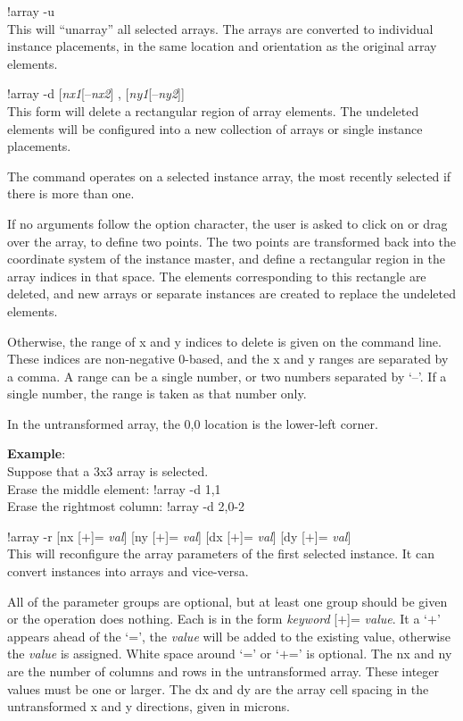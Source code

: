 \begin{description}
\item{\vt !array -u}\\
This will ``unarray'' all selected arrays.  The arrays are converted
to individual instance placements, in the same location and
orientation as the original array elements.

\item{{\vt !array -d} [{\it nx1\/}[--{\it nx2\/}] ,
 [{\it ny1\/}[--{\it ny2\/}]]}\\
This form will delete a rectangular region of array elements.  The
undeleted elements will be configured into a new collection of arrays
or single instance placements.

The command operates on a selected instance array, the most recently
selected if there is more than one.

If no arguments follow the option character, the user is asked to
click on or drag over the array, to define two points.  The two points
are transformed back into the coordinate system of the instance
master, and define a rectangular region in the array indices in that
space.  The elements corresponding to this rectangle are deleted, and
new arrays or separate instances are created to replace the undeleted
elements.

Otherwise, the range of x and y indices to delete is given on the
command line.  These indices are non-negative 0-based, and the x and y
ranges are separated by a comma.  A range can be a single number, or
two numbers separated by `--'.  If a single number, the range is taken
as that number only.

In the untransformed array, the 0,0 location is the lower-left
corner.

{\bf Example}:\\
Suppose that a 3x3 array is selected.\\
Erase the middle element: {\vt !array -d 1,1}\\
Erase the rightmost column: {\vt !array -d 2,0-2}

\item{{\vt !array -r} [{\vt nx} [$+$]= {\it val\/}]
      [{\vt ny} [$+$]= {\it val\/}]
      [{\vt dx} [$+$]= {\it val\/}] [{\vt dy} [$+$]= {\it val\/}]}\\
This will reconfigure the array parameters of the first selected
instance.  It can convert instances into arrays and vice-versa.

All of the parameter groups are optional, but at least one group
should be given or the operation does nothing.  Each is in the form
{\it keyword} [$+$]= {\it value\/}.  It a `$+$' appears ahead of the
`=', the {\it value} will be added to the existing value, otherwise
the {\it value} is assigned.  White space around `=' or `$+$=' is
optional.  The {\vt nx} and {\vt ny} are the number of columns and rows
in the untransformed array.  These integer values must be one or
larger.  The {\vt dx} and {\vt dy} are the array cell spacing in the
untransformed x and y directions, given in microns.


\end{description}
